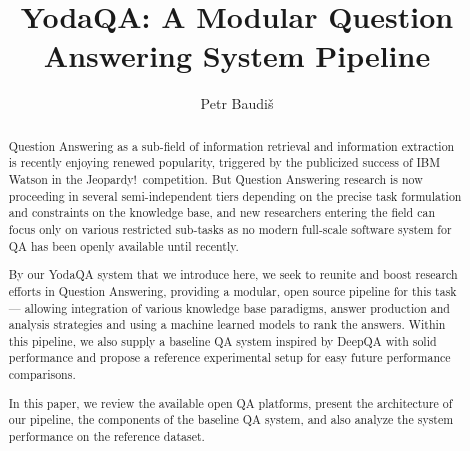 \documentclass{poster15}
\begin{document}

%
\title{YodaQA: A Modular Question Answering System Pipeline}
%

%
\author{Petr Baudiš}
%


\maketitle


\begin{abstract}
	Question Answering as a sub-field of information retrieval
	and information extraction is recently enjoying renewed
	popularity, triggered by the publicized success of IBM Watson in
	the Jeopardy!\ competition.  But Question Answering research is
	now proceeding in several semi-independent tiers depending on the
	precise task formulation and constraints on the knowledge base,
	and new researchers entering the field can focus only on
	various restricted sub-tasks as no modern full-scale software
	system for QA has been openly available until recently.

	By our YodaQA system that we introduce here,
	we seek to reunite and boost research efforts
	in Question Answering, providing a modular, open source
	pipeline for this task --- allowing integration of
	various knowledge base paradigms,
	answer production and analysis strategies and using a machine
	learned models to rank the answers.  Within this pipeline,
	we also supply a baseline QA system inspired by DeepQA
	with solid performance
	and propose a reference experimental setup
	for easy future performance comparisons.

	In this paper, we review the available open QA platforms,
	present the architecture of our pipeline,
	the components of the baseline QA system, and also analyze
	the system performance on the reference dataset.
\end{abstract}
\end{document}

